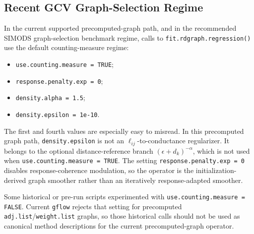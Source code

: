 \documentclass[11pt]{article}
\newcommand{\code}[1]{\texttt{#1}}
\begin{document}
\subsection{Recent GCV Graph-Selection Regime}

In the current supported precomputed-graph path, and in the recommended SIMODS
graph-selection benchmark regime, calls to \code{fit.rdgraph.regression()} use
the default counting-measure regime:
\begin{itemize}[leftmargin=1.5em]
  \item \code{use.counting.measure = TRUE};
  \item \code{response.penalty.exp = 0};
  \item \code{density.alpha = 1.5};
  \item \code{density.epsilon = 1e-10}.
\end{itemize}
The first and fourth values are especially easy to misread. In this precomputed
graph path, \code{density.epsilon} is not an \(\ell_{ij}\)-to-conductance
regularizer. It belongs to the optional distance-reference branch
\((\epsilon+d_k)^{-\alpha}\), which is not used when
\code{use.counting.measure = TRUE}. The setting
\code{response.penalty.exp = 0} disables response-coherence modulation, so the
operator is the initialization-derived graph smoother rather than an
iteratively response-adapted smoother.

Some historical or pre-run scripts experimented with
\code{use.counting.measure = FALSE}. Current \code{gflow} rejects that setting
for precomputed \code{adj.list}/\code{weight.list} graphs, so those historical
calls should not be used as canonical method descriptions for the current
precomputed-graph operator.
\end{document}

